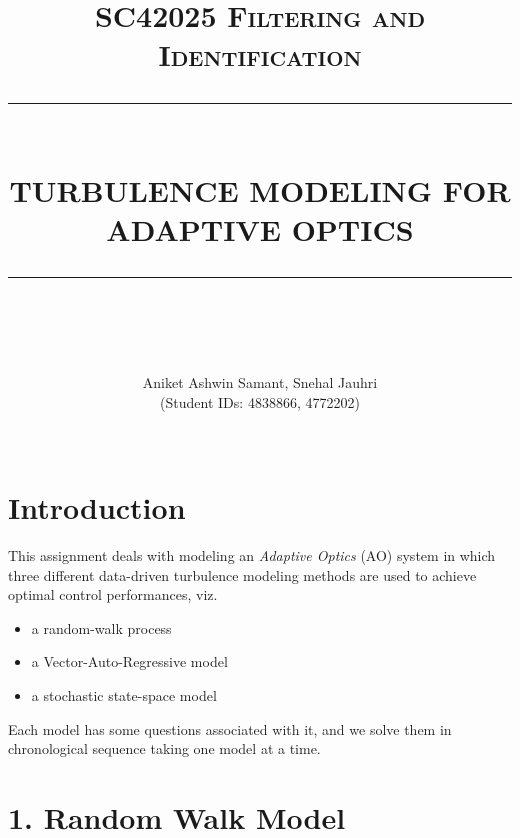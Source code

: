 \documentclass[12pt]{report}
\newcommand{\HRule}[1]{\rule{\linewidth}{#1}}
\begin{document}
\title{ \normalsize \textsc{SC42025 Filtering and Identification}
		\\ [2.0cm]
		\HRule{0.5pt} \\
		\LARGE \textbf{\uppercase{Turbulence Modeling for Adaptive Optics}}
		\HRule{2pt} \\ [0.5cm]
		\normalsize %
		\vspace*{5\baselineskip}}


\author{
		Aniket Ashwin Samant, Snehal Jauhri \\
		(Student IDs: 4838866, 4772202) \\ 
 \\ }

\maketitle
\tableofcontents
\newpage

\sectionfont{\scshape}


\section*{Introduction}

This assignment deals with modeling an \textit{Adaptive Optics} (AO) system in which three different data-driven turbulence modeling methods are used to achieve optimal control performances, viz.
\begin{itemize}
	\item a random-walk process
	\item a Vector-Auto-Regressive model
	\item a stochastic state-space model
\end{itemize}

Each model has some questions associated with it, and we solve them in chronological sequence taking one model at a time.


\section*{1. Random Walk Model}
\end{document}
